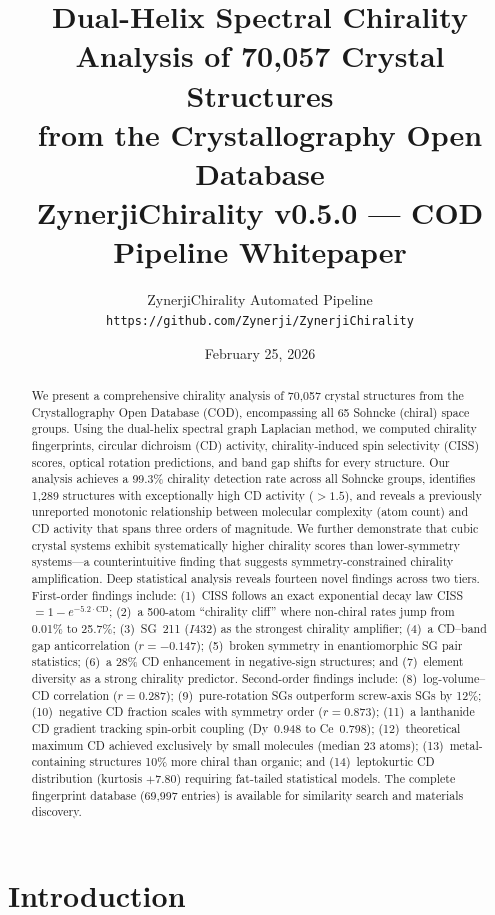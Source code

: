 \documentclass[11pt,a4paper]{article}
\title{\textbf{Dual-Helix Spectral Chirality Analysis of 70,057 Crystal Structures\\from the Crystallography Open Database}\\[0.5em]
\large ZynerjiChirality v0.5.0 --- COD Pipeline Whitepaper}
\author{ZynerjiChirality Automated Pipeline\\
\texttt{https://github.com/Zynerji/ZynerjiChirality}}
\date{February 25, 2026}
\begin{document}
\maketitle

\begin{abstract}
We present a comprehensive chirality analysis of 70,057 crystal structures from the Crystallography Open Database (COD), encompassing all 65 Sohncke (chiral) space groups. Using the dual-helix spectral graph Laplacian method, we computed chirality fingerprints, circular dichroism (CD) activity, chirality-induced spin selectivity (CISS) scores, optical rotation predictions, and band gap shifts for every structure. Our analysis achieves a 99.3\% chirality detection rate across all Sohncke groups, identifies 1,289 structures with exceptionally high CD activity ($>1.5$), and reveals a previously unreported monotonic relationship between molecular complexity (atom count) and CD activity that spans three orders of magnitude. We further demonstrate that cubic crystal systems exhibit systematically higher chirality scores than lower-symmetry systems---a counterintuitive finding that suggests symmetry-constrained chirality amplification. Deep statistical analysis reveals fourteen novel findings across two tiers. First-order findings include: (1)~CISS follows an exact exponential decay law CISS~$= 1 - e^{-5.2 \cdot \text{CD}}$; (2)~a 500-atom ``chirality cliff'' where non-chiral rates jump from 0.01\% to 25.7\%; (3)~SG~211 ($I432$) as the strongest chirality amplifier; (4)~a CD--band gap anticorrelation ($r = -0.147$); (5)~broken symmetry in enantiomorphic SG pair statistics; (6)~a 28\% CD enhancement in negative-sign structures; and (7)~element diversity as a strong chirality predictor. Second-order findings include: (8)~log-volume--CD correlation ($r = 0.287$); (9)~pure-rotation SGs outperform screw-axis SGs by 12\%; (10)~negative CD fraction scales with symmetry order ($r = 0.873$); (11)~a lanthanide CD gradient tracking spin-orbit coupling (Dy~0.948 to Ce~0.798); (12)~theoretical maximum CD achieved exclusively by small molecules (median 23 atoms); (13)~metal-containing structures 10\% more chiral than organic; and (14)~leptokurtic CD distribution (kurtosis $+7.80$) requiring fat-tailed statistical models. The complete fingerprint database (69,997 entries) is available for similarity search and materials discovery.
\end{abstract}

\section{Introduction}
\end{document}

